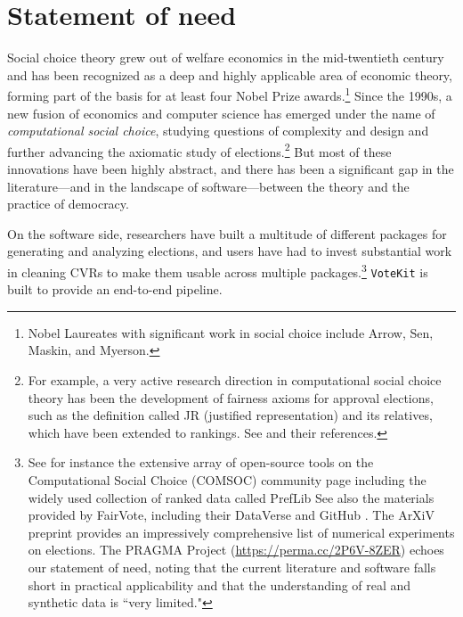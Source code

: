 \documentclass{article}
\newcommand{\VK}{{\tt VoteKit}\xspace}
\begin{document}
\clearpage

\section{Statement of need}
Social choice theory grew out of welfare economics in the mid-twentieth century and has been recognized as a deep and highly applicable area of economic theory, forming part of the basis for at least four Nobel Prize awards.\footnote{Nobel Laureates with significant work in social choice include Arrow, Sen, Maskin, and Myerson.}  Since the 1990s, a new fusion of economics and computer science has emerged under the name of {\em computational social choice}, studying questions of complexity and design and further advancing the axiomatic study of elections.\footnote{For example, a very active research direction in computational social choice theory has been the development of fairness axioms for approval elections, such as the definition called JR (justified representation) and its relatives, which have been extended to rankings.  See \cite{aziz2017justified,skowron2017proportional} and their references.}  
But most of these innovations have been highly abstract, and there has been a significant gap in the literature---and in the landscape of software---between the theory and the practice of democracy.  

On the software side, researchers have built a multitude of different packages for generating and analyzing elections, and users have had to invest substantial work in cleaning CVRs to make them usable across multiple packages.\footnote{See for instance the extensive array of open-source tools on the Computational Social Choice (COMSOC) community page \cite{ComSoc} including the widely used collection of ranked data called {\sf PrefLib} \cite{ComSoc}  See also the materials provided by FairVote, including their DataVerse and GitHub \cite{RCV-Cruncher}. The ArXiV preprint \cite{GuideExperiments} provides an impressively comprehensive list of numerical experiments on elections. The PRAGMA Project (\url{https://perma.cc/2P6V-8ZER}) echoes our statement of need, noting that the current literature and software falls short in practical applicability and that the understanding of real and synthetic data is ``very limited."}
\VK is built to provide an end-to-end pipeline.
\end{document}
